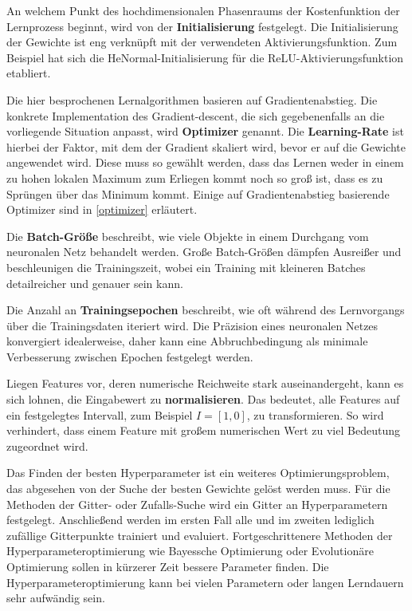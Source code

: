 An welchem Punkt des hochdimensionalen Phasenraums der Kostenfunktion der Lernprozess beginnt, wird von der \textbf{Initialisierung} festgelegt. Die Initialisierung der Gewichte ist eng verknüpft mit der verwendeten Aktivierungsfunktion. Zum Beispiel hat sich die HeNormal-Initialisierung \cite{He} für die ReLU-Aktivierungsfunktion etabliert.

Die hier besprochenen Lernalgorithmen basieren auf Gradientenabstieg. Die konkrete Implementation des Gradient-descent, die sich gegebenenfalls an die vorliegende Situation anpasst, wird \textbf{Optimizer} genannt. Die \textbf{Learning-Rate} ist hierbei der Faktor, mit dem der Gradient skaliert wird, bevor er auf die Gewichte angewendet wird. Diese muss so gewählt werden, dass das Lernen weder in einem zu hohen lokalen Maximum zum Erliegen kommt noch so groß ist, dass es zu Sprüngen über das Minimum kommt. Einige auf Gradientenabstieg basierende Optimizer sind in \textsf{\autoref{optimizer}} erläutert.

Die \textbf{Batch-Größe} beschreibt, wie viele Objekte in einem Durchgang vom neuronalen Netz behandelt werden. Große Batch-Größen dämpfen Ausreißer und beschleunigen die Trainingszeit, wobei ein Training mit kleineren Batches detailreicher und genauer sein kann. 

Die Anzahl an \textbf{Trainingsepochen} beschreibt, wie oft während des Lernvorgangs über die Trainingsdaten iteriert wird. Die Präzision eines neuronalen Netzes konvergiert idealerweise, daher kann eine Abbruchbedingung als minimale Verbesserung zwischen Epochen festgelegt werden. 

Liegen Features vor, deren numerische Reichweite stark auseinandergeht, kann es sich lohnen, die Eingabewert zu \textbf{normalisieren}. Das bedeutet, alle Features auf ein festgelegtes Intervall, zum Beispiel $I=[1,0]$, zu transformieren. So wird verhindert, dass einem Feature mit großem numerischen Wert zu viel Bedeutung zugeordnet wird.

\label{random-search}
Das Finden der besten Hyperparameter ist ein weiteres Optimierungsproblem, das abgesehen von der Suche der besten Gewichte gelöst werden muss. Für die Methoden der Gitter- oder Zufalls-Suche wird ein Gitter an Hyperparametern festgelegt. Anschließend werden im ersten Fall alle und im zweiten lediglich zufällige Gitterpunkte trainiert und evaluiert. Fortgeschrittenere Methoden der Hyperparameteroptimierung wie Bayessche Optimierung \cite{bayesian} oder Evolutionäre Optimierung \cite{hyperband} sollen in kürzerer Zeit bessere Parameter finden. Die Hyperparameteroptimierung kann bei vielen Parametern oder langen Lerndauern sehr aufwändig sein. 


